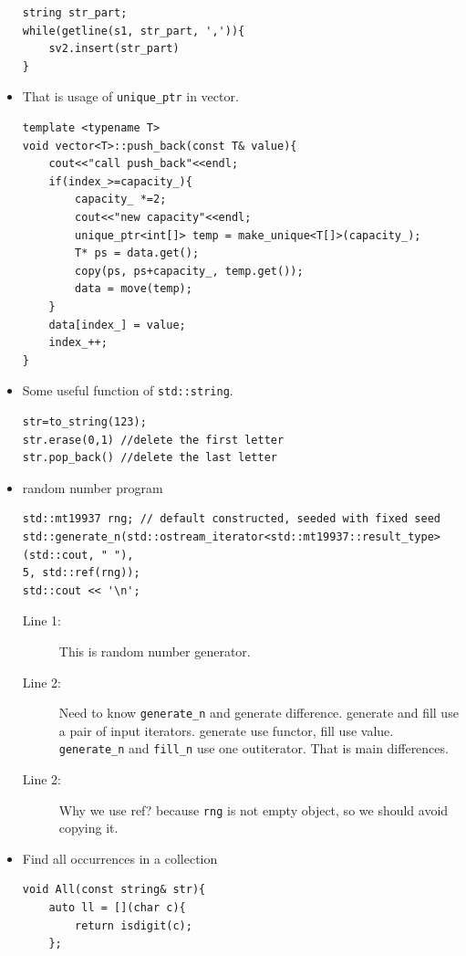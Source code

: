 \documentclass[a4paper,11pt,twoside]{book}
\begin{document}
\begin{itemize}
\begin{lstlisting}[numbers=none]
string str_part;
while(getline(s1, str_part, ',')){
	sv2.insert(str_part)
}	
\end{lstlisting}


\item That is usage of \texttt{unique\_ptr} in vector. 

\begin{lstlisting}[numbers=none]
template <typename T>
void vector<T>::push_back(const T& value){
	cout<<"call push_back"<<endl;
	if(index_>=capacity_){
		capacity_ *=2;
		cout<<"new capacity"<<endl;
		unique_ptr<int[]> temp = make_unique<T[]>(capacity_);
		T* ps = data.get();
		copy(ps, ps+capacity_, temp.get());
		data = move(temp);
	}
	data[index_] = value;
	index_++;
}
\end{lstlisting}


\item Some useful function of \texttt{std::string}.
\begin{lstlisting}[numbers=none]
str=to_string(123);
str.erase(0,1) //delete the first letter
str.pop_back() //delete the last letter
\end{lstlisting}

\item random number program
\begin{lstlisting}[numbers=none]
std::mt19937 rng; // default constructed, seeded with fixed seed
std::generate_n(std::ostream_iterator<std::mt19937::result_type>(std::cout, " "),
5, std::ref(rng));
std::cout << '\n';
\end{lstlisting}
\begin{description}
	\item[Line 1:] This is random number generator. 
	\item[Line 2:] Need to know \texttt{generate\_n} and generate difference. generate and fill use a pair of input iterators. generate use functor, fill use value. \texttt{generate\_n} and \texttt{fill\_n} use one outiterator. That is main differences. 
	\item[Line 2:] Why we use ref? because \texttt{rng} is not empty object, so we should avoid copying it. 
	
\end{description}

\item Find all occurrences in a collection
\begin{lstlisting}[numbers=none]
void All(const string& str){
	auto ll = [](char c){
		return isdigit(c);
	};
	

\end{lstlisting}
\end{itemize}
\end{document}
